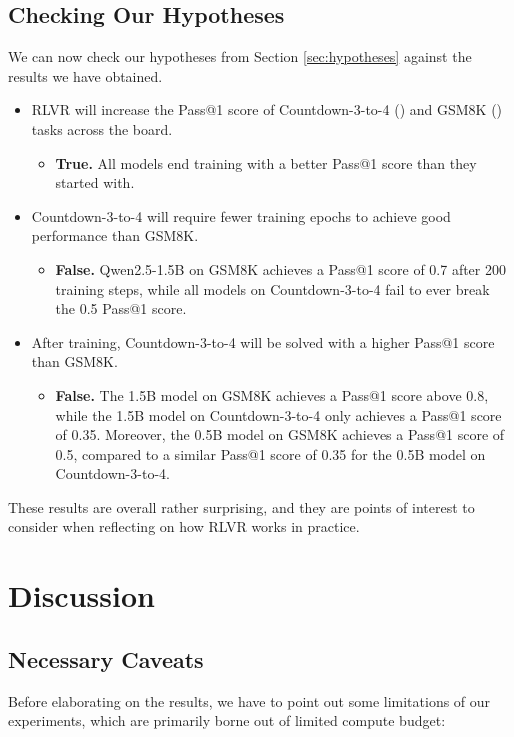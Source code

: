 \documentclass{article} %
\theoremstyle{definition}
\begin{document}
\subsection{Checking Our Hypotheses}
We can now check our hypotheses from Section \ref{sec:hypotheses} against the 
results we have obtained.
\begin{itemize}
    \item RLVR will increase the Pass@1 score of Countdown-3-to-4 (\cite{countdown}) and GSM8K (\cite{gsm8k}) tasks across the board.
        \begin{itemize}
            \item \textbf{True.} All models end training with a better Pass@1 score than they started with.
        \end{itemize}
    \item Countdown-3-to-4 will require fewer training epochs to achieve good performance than GSM8K.
        \begin{itemize}
            \item \textbf{False.} Qwen2.5-1.5B on GSM8K achieves a Pass@1 score of 0.7 after 200 training steps,
                while all models on Countdown-3-to-4 fail to ever break the 0.5 Pass@1 score.
        \end{itemize}
    \item After training, Countdown-3-to-4 will be solved with a higher Pass@1 score than GSM8K.
        \begin{itemize}
            \item \textbf{False.} The 1.5B model on GSM8K achieves a Pass@1 score above 0.8, 
                while the 1.5B model on Countdown-3-to-4 only achieves a Pass@1 score of 0.35.
                Moreover, the 0.5B model on GSM8K achieves a Pass@1 score of 0.5, compared to 
                a similar Pass@1 score of 0.35 for the 0.5B model on Countdown-3-to-4.
        \end{itemize}
\end{itemize}
These results are overall rather surprising, and they are points of interest to consider
when reflecting on how RLVR works in practice.

\section{Discussion}
\subsection{Necessary Caveats}
Before elaborating on the results, we have to point out some limitations of our experiments,
which are primarily borne out of limited compute budget:
\end{document}
